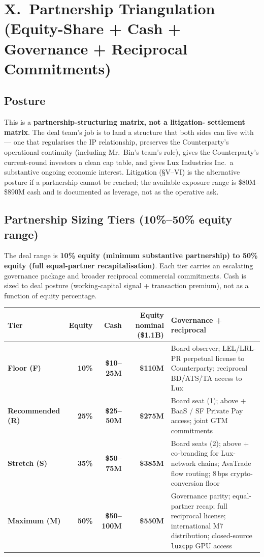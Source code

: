 \documentclass[11pt,letterpaper]{article}
\begin{document}
\section*{X.\ Partnership Triangulation (Equity-Share + Cash + Governance + Reciprocal Commitments)}

\subsection*{Posture}

This is a \textbf{partnership-structuring matrix, not a litigation-
settlement matrix}. The deal team's job is to land a structure that
both sides can live with --- one that regularises the IP relationship,
preserves the Counterparty's operational continuity (including Mr.\
Bin's team's role), gives the Counterparty's current-round investors
a clean cap table, and gives Lux Industries Inc.\ a substantive
ongoing economic interest. Litigation (\S V--VI) is the alternative
posture if a partnership cannot be reached; the available exposure
range is \$80M--\$890M cash and is documented as leverage, not as
the operative ask.

\subsection*{Partnership Sizing Tiers (10\%--50\% equity range)}

The deal range is \textbf{10\% equity (minimum substantive
partnership) to 50\% equity (full equal-partner recapitalisation)}.
Each tier carries an escalating governance package and broader
reciprocal commercial commitments. Cash is sized to deal posture
(working-capital signal + transaction premium), not as a function of
equity percentage.

\begin{center}
\begin{small}
\begin{tabular}{p{2.3cm} r r r p{4.8cm}}
\toprule
\textbf{Tier} & \textbf{Equity} & \textbf{Cash} & \textbf{Equity nominal (\$1.1B)} & \textbf{Governance + reciprocal} \\
\midrule
\textbf{Floor (F)}        & \textbf{10\%}   & \textbf{\$10--25M} & \textbf{\$110M}  & Board observer; LEL/LRL-PR perpetual license to Counterparty; reciprocal BD/ATS/TA access to Lux \\
\textbf{Recommended (R)}  & \textbf{25\%}   & \textbf{\$25--50M} & \textbf{\$275M}  & Board seat (1); above + BaaS / SF Private Pay access; joint GTM commitments \\
\textbf{Stretch (S)}      & \textbf{35\%}   & \textbf{\$50--75M} & \textbf{\$385M}  & Board seats (2); above + co-branding for Lux-network chains; AvaTrade flow routing; 8\,bps crypto-conversion floor \\
\textbf{Maximum (M)}      & \textbf{50\%}   & \textbf{\$50--100M} & \textbf{\$550M} & Governance parity; equal-partner recap; full reciprocal license; international M7 distribution; closed-source \texttt{luxcpp} GPU access \\
\bottomrule
\end{tabular}
\end{small}
\end{center}
\end{document}

